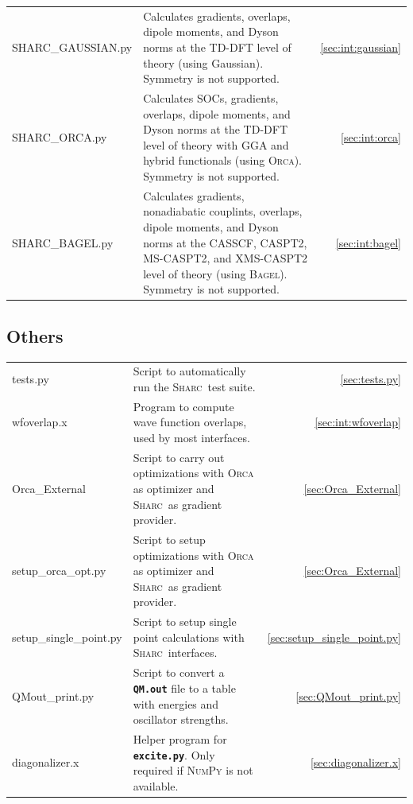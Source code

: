 \documentclass[a4paper,10pt,DIV=15,openany]{scrbook}
\newcommand{\sharc}{\textsc{Sharc}}
\newcommand{\ttt}[1]{\textbf{\texttt{#1}}}
\begin{document}
\begin{tabular}{>{\ttfamily}lp{10.5cm}r}
  SHARC\_GAUSSIAN.py    &Calculates       gradients,                         overlaps,     dipole moments, and Dyson norms at the TD-DFT level of theory (using Gaussian). Symmetry is not supported.  &\ref{sec:int:gaussian}\\
  SHARC\_ORCA.py        &Calculates SOCs, gradients,                         overlaps,     dipole moments, and Dyson norms at the TD-DFT level of theory with GGA and hybrid functionals (using \textsc{Orca}). Symmetry is not supported.  &\ref{sec:int:orca}\\
  SHARC\_BAGEL.py        &Calculates      gradients, nonadiabatic couplints, overlaps,     dipole moments, and Dyson norms at the CASSCF, CASPT2, MS-CASPT2, and XMS-CASPT2 level of theory (using \textsc{Bagel}). Symmetry is not supported.  &\ref{sec:int:bagel}\\
\end{tabular}


\subsection{Others}

\begin{tabular}{>{\ttfamily}lp{10.5cm}r}
  tests.py              &Script to automatically run the \sharc\ test suite.                                                    &\ref{sec:tests.py}\\
  wfoverlap.x           &Program to compute wave function overlaps, used by most interfaces.                                    &\ref{sec:int:wfoverlap}\\
  Orca\_External        &Script to carry out optimizations with \textsc{Orca} as optimizer and \sharc\ as gradient provider.    &\ref{sec:Orca_External}\\
  setup\_orca\_opt.py   &Script to setup optimizations with \textsc{Orca} as optimizer and \sharc\ as gradient provider.        &\ref{sec:Orca_External}\\
  setup\_single\_point.py   &Script to setup single point calculations with \sharc\ interfaces.        &\ref{sec:setup_single_point.py}\\
  QMout\_print.py       &Script to convert a \ttt{QM.out} file to a table with energies and oscillator strengths.               &\ref{sec:QMout_print.py}\\
  diagonalizer.x        &Helper program for \ttt{excite.py}. Only required if \textsc{NumPy} is not available.                  &\ref{sec:diagonalizer.x}\\
\end{tabular}
\end{document}
